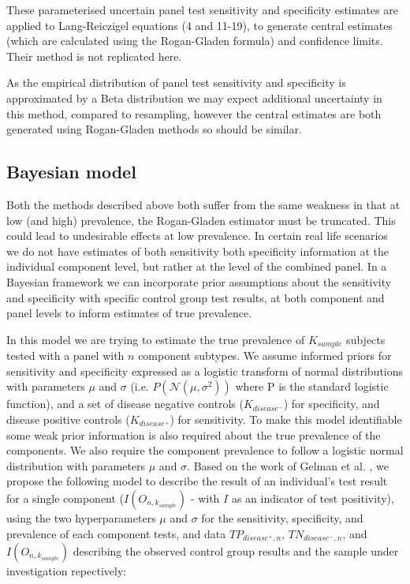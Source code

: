 \documentclass[a4paper, 12pt, twoside]{article}
\let\Oldsubsection\subsection
\renewcommand{\subsection}{\FloatBarrier\Oldsubsection}
\begin{document}
These parameterised uncertain panel test sensitivity and specificity estimates are applied to Lang-Reiczigel equations (4 and 11-19)\cite{lang2014}, to generate central estimates (which are calculated using the Rogan-Gladen formula) and confidence limits. Their method is not replicated here.

As the empirical distribution of panel test sensitivity and specificity is approximated by a Beta distribution we may expect additional uncertainty in this method, compared to resampling, however the central estimates are both generated using Rogan-Gladen methods so should be similar.

\subsection{Bayesian model}

Both the methods described above both suffer from the same weakness in that at low (and high) prevalence, the Rogan-Gladen estimator must be truncated. This could lead to undesirable effects at low prevalence. In certain real life scenarios we do not have estimates of both sensitivity both specificity information at the individual component level, but rather at the level of the combined panel. In a Bayesian framework we can incorporate prior assumptions about the sensitivity and specificity with specific control group test results, at both component and panel levels to inform estimates of true prevalence. 


In this model we are trying to estimate the true prevalence of \(K_{sample}\) subjects tested with a panel with \(n\) component subtypes. We assume informed priors for sensitivity and specificity expressed as a logistic transform of normal distributions with parameters \(\mu\) and \(\sigma\) (i.e. \(P(\mathcal{N}(\mu,\sigma^2))\) where P is the standard logistic function), and a set of disease negative controls (\(K_{disease^-}\)) for specificity, and disease positive controls (\(K_{disease^+}\)) for sensitivity. To make this model identifiable some weak prior information is also required about the true prevalence of the components. We also require the component prevalence to follow a logistic normal distribution with parameters \(\mu\) and \(\sigma\). Based on the work of Gelman et al. \cite{gelman2020}, we propose the following model to describe the result of an individual's test result for a single component (\(I(O_{n,k_{sample}})\) - with \(I\) as an indicator of test positivity), using the two hyperparameters \(\mu\) and \(\sigma\) for the sensitivity, specificity, and prevalence of each component tests, and data \(TP_{disease^+,n}\), \(TN_{disease^-,n}\), and \(I(O_{n,k_{sample}})\) describing the observed control group results and the sample under investigation repectively:
\end{document}
